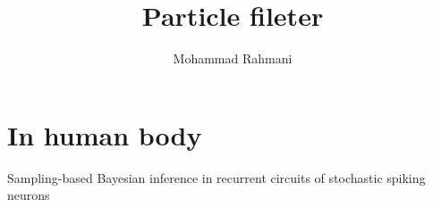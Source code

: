 \documentclass[a4paper]{article}
\title{Particle fileter}
\date{}
\author{Mohammad Rahmani}
\begin{document}
    \maketitle
    
    
    \section{In human body}
        Sampling-based Bayesian inference in recurrent circuits of stochastic spiking neurons 
        
        
\end{document}
